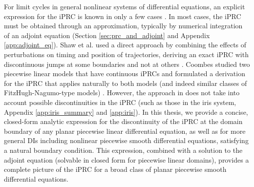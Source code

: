 \documentclass[12pt]{article}
\begin{document}
   
For limit cycles in general nonlinear systems of differential equations, an explicit expression for the iPRC is known in only a few cases \cite{BrownMoehlisHolmes:2004:NeComp}. In most cases, the iPRC must be obtained through an approximation, typically by numerical integration of an adjoint equation (Section \ref{sec:prc_and_adjoint} and Appendix \ref{app:adjoint_eq}).  Shaw et al. used a direct approach by combining the effects of perturbations on timing and position of trajectories, deriving an exact iPRC with discontinuous jumps at some boundaries and not at others \cite{ShawParkChielThomas2012SIADS}.  Coombes studied two piecewise linear models that have continuous iPRCs and formulated a derivation for the iPRC that applies naturally to both models (and indeed similar classes of FitzHugh-Nagumo-type models) \cite{Coombes:2008:SIADS}.  However, the approach in \cite{Coombes:2008:SIADS} does not take into account possible discontinuities in the iPRC (such as those in the iris system, Appendix \ref{app:iris_summary} and \ref{app:iris}).  In 
this thesis, we provide a concise, closed-form analytic expression for the discontinuity of the iPRC at the domain boundary of any planar piecewise linear differential equation, as well as for more general DIs including nonlinear piecewise smooth differential equations, satisfying a natural boundary condition.  This expression, combined with a solution to the adjoint equation (solvable in closed form for piecewise linear domains), provides a complete picture of the iPRC for a broad class of planar piecewise smooth differential equations.





%  


\end{document}

